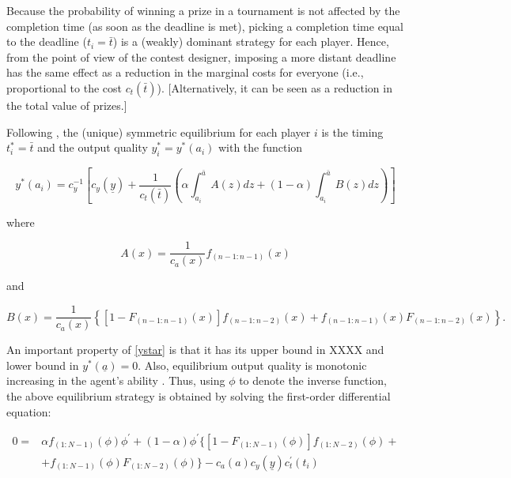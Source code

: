 \documentclass[12pt,]{article}
\theoremstyle{plain} %
\newcommand\deadline{\bar{t}}
\newcommand\target{\underline{y}}
\newcommand\ctime{c_{t}}
\newcommand\cscore{c_{y}}
\newcommand\lotype{\underline{a}}
\newcommand\hitype{\bar{a}}
\begin{document}
Because the probability of winning a prize in a tournament is not
affected by the completion time (as soon as the deadline is met),
picking a completion time equal to the deadline (\(t_i=\deadline\)) is a
(weakly) dominant strategy for each player. Hence, from the point of
view of the contest designer, imposing a more distant deadline has the
same effect as a reduction in the marginal costs for everyone (i.e.,
proportional to the cost \(\ctime(\deadline)\)). {[}Alternatively, it
can be seen as a reduction in the total value of prizes.{]}

Following \citet{moldovanu2001optimal}, the (unique) symmetric
equilibrium for each player \(i\) is the timing \(t_i^*=\deadline\) and
the output quality \(y_i^*=y^*(a_i)\) with the function

\begin{equation} \label{ystar}
y^*(a_i) = 
    \cscore^{-1}
    \left[\cscore(\target) 
    + \frac{1}{\ctime(\deadline)}
    \left(\alpha \int_{a_i}^{\hitype} A(z) dz
      + (1-\alpha) \int_{a_i}^{\hitype} B(z)  dz
    \right)
    \right]
\end{equation}

where

\begin{equation}
  A(x) = \frac{1}{c_{a}(x)} f_{(n-1:n-1)}(x)
\end{equation}

and

\begin{equation}
  B(x) = \frac{1}{c_{a}(x)} \left\{
      \left[1- F_{(n-1:n-1)}(x)\right]f_{(n-1:n-2)}(x)
      + f_{(n-1:n-1)}(x) F_{(n-1:n-2)}(x)
    \right\}.
\end{equation}

An important property of \eqref{ystar} is that it has its upper bound in
XXXX and lower bound in \(y^*(\lotype) = 0\). Also, equilibrium output
quality is monotonic increasing in the agent's ability
\citep[see][]{moldovanu2001optimal}. Thus, using \(\phi\) to denote the
inverse function, the above equilibrium strategy is obtained by solving
the first-order differential equation:

\begin{align}
    \label{foc0}
0 = & \alpha f_{(1:N-1)}(\phi) \phi^{\prime} 
    + (1-\alpha)\phi^{\prime}\{[1 - F_{(1:N-1)}(\phi)]f_{(1:N-2)}(\phi) + \nonumber\\
    & + f_{(1:N-1)}(\phi) F_{(1:N-2)}(\phi)\} - c_{a}(a) c_{y}(\target) c_{t}^{\prime}(t_i)
\end{align}
\end{document}

